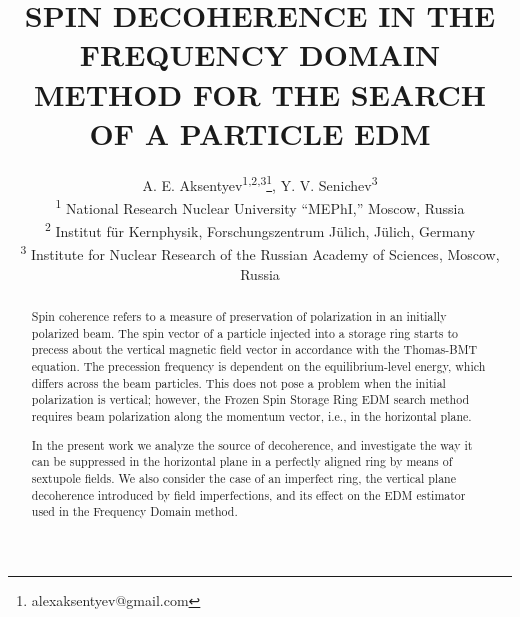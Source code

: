 \documentclass[a4paper]{jacow}
\begin{document}
\title{SPIN DECOHERENCE IN THE FREQUENCY DOMAIN METHOD FOR THE SEARCH OF A PARTICLE EDM}
\author{A. E. Aksentyev\textsuperscript{1,2,3}\thanks{alexaksentyev@gmail.com},
  Y. V. Senichev\textsuperscript{3} \\
  \textsuperscript{1} National Research Nuclear University ``MEPhI,'' Moscow, Russia \\
  \textsuperscript{2} Institut f\"ur Kernphysik, Forschungszentrum J\"ulich, J\"ulich, Germany\\
  \textsuperscript{3} Institute for Nuclear Research of the Russian Academy of Sciences, Moscow, Russia}
\maketitle

\begin{abstract}
  Spin coherence refers to a measure of preservation of polarization in an initially polarized beam.
  The spin vector of a particle injected into a storage ring starts to precess about
  the vertical magnetic field vector in accordance with the Thomas-BMT equation. The precession frequency
  is dependent on the equilibrium-level energy, which differs across the beam particles.
  This does not pose a problem when the initial polarization is vertical; however,
  the Frozen Spin Storage Ring EDM search method requires beam polarization along the momentum vector,
  i.e., in the horizontal plane. 
  
  In the present work we analyze the source of decoherence, and investigate the way it can be suppressed
  in the horizontal plane in a perfectly aligned ring by means of sextupole fields. We also consider
  the case of an imperfect ring, the vertical plane decoherence introduced by field imperfections,
  and its effect on the EDM estimator used in the Frequency Domain method.
\end{abstract}
\end{document}

